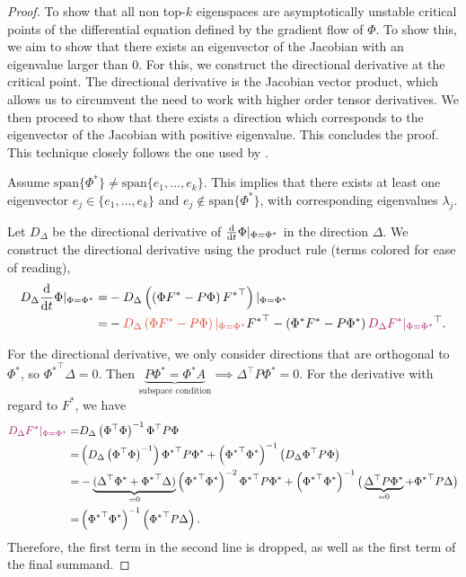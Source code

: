 \begin{proof}
To show that all non top-$k$ eigenspaces are asymptotically unstable critical points of the differential equation defined by the gradient flow of $\Phi$.
To show this, we aim to show that there exists an eigenvector of the Jacobian with an eigenvalue larger than $0$.
For this, we construct the directional derivative at the critical point.
The directional derivative is the Jacobian vector product, which allows us to circumvent the need to work with higher order tensor derivatives.
We then proceed to show that there exists a direction which corresponds to the eigenvector of the Jacobian with positive eigenvalue.
This concludes the proof.
This technique closely follows the one used by \cite{lelan2023bootstrapped}.

Assume $\mathrm{span}\{\Phi^*\} \neq \mathrm{span}\{e_1,\dots,e_k\}$. This implies that there exists at least one eigenvector $e_j \in \{e_1,\dots,e_k\}$ and $e_j \notin \mathrm{span}\{\Phi^*\}$, with corresponding eigenvalues $\lambda_j$.

Let $D_\Delta$ be the directional derivative of $\frac{\mathrm{d}}{\mathrm{d} t} \Phi |_{\Phi=\Phi^*}$ in the direction $\Delta$.
We construct the directional derivative using the product rule (terms colored for ease of reading),
\begin{align*}
D_\Delta \ddt{t} \Phi |_{\Phi=\Phi^*} = & -D_\Delta \left(\left(\Phi F^* - P \Phi\right) {F^*}^\top\right)|_{\Phi=\Phi^*}\\
     = & -{\color{uoftred}D_\Delta \left(\Phi F^* - P \Phi\right)|_{\Phi=\Phi^*}} {F^*}^\top - \left(\Phi^* F^* - P \Phi^*\right) {\color{uoftmagenta}D_\Delta {F^*}|_{\Phi=\Phi^*}}^\top.
\end{align*}

For the directional derivative, we only consider directions that are orthogonal to $\Phi^*$, so ${\Phi^*}^\top\Delta = 0$. Then $\underbrace{P{\Phi^*} = {\Phi^*} A}_{\text{subspace condition}} \implies \Delta^\top P \Phi^* = 0.$
For the derivative with regard to $F^*$, we have
\begin{align*}
    {\color{uoftmagenta}D_\Delta F^*|_{\Phi = \Phi^*}} =& D_\Delta \left(\Phi^\top \Phi\right)^{-1}\Phi^\top P \Phi\nonumber\\
    =& \left(D_\Delta \left(\Phi^\top \Phi\right)^{-1} \right) {\Phi^*}^\top P {\Phi^*} + \left({\Phi^*}^\top {\Phi^*}\right)^{-1} \left(D_\Delta \Phi^\top P \Phi  \right)\nonumber\\
    =& -\underbrace{(\Delta^\top \Phi^* + {\Phi^*}^\top \Delta)}_{=0}\left({\Phi^*}^\top {\Phi^*}\right)^{-2}{\Phi^*}^\top P {\Phi^*} + \left({\Phi^*}^\top {\Phi^*}\right)^{-1}\big(\underbrace{\Delta^\top P {\Phi^*}}_{=0} + {\Phi^*}^\top P \Delta\big)\nonumber\\
    =& \left({\Phi^*}^\top {\Phi^*}\right)^{-1}\left({\Phi^*}^\top P \Delta\right). \label{eq2}
\end{align*}
Therefore, the first term in the second line is dropped, as well as the first term of the final summand.


\end{proof}
